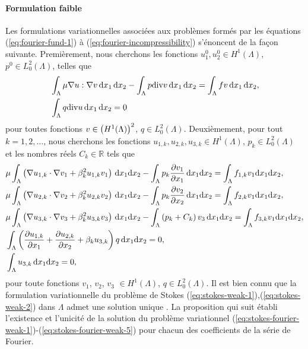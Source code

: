 \paragraph{Formulation faible}\label{sec:stokes-fourier-weak}
Les formulations variationnelles associées aux problèmes formés par
les équations (\ref{eq:fourier-fund-1}) à
(\ref{eq:fourier-incompressibility}) s'énoncent de la façon
suivante. Premièrement, nous cherchons les fonctions $u_1^0,u_2^0
\in H^1(\Lambda)$, $p^0 \in L^2_0(\Lambda)$, telles que
\begin{align}
&\int_\Lambda \mu \nabla u : \nabla v \,\mathrm dx_1\,\mathrm dx_2 -
\int_\Lambda p\mathrm{div} v \,\mathrm dx_1\,\mathrm dx_2 = \int_\Lambda f v
\,\mathrm dx_1\,\mathrm dx_2,\label{eq:stokes-weak-1}\\
&\int_\Lambda q\mathrm{div} u \,\mathrm dx_1\,\mathrm dx_2 = 0\label{eq:stokes-weak-2}
\end{align}
pour toutes fonctions $v \in \left( H^1(\Lambda) \right)^2$, $q \in
L_0^2(\Lambda)$. Deuxièmement, pour tout $k = 1, 2, \dots$, nous cherchons les
fonctions $u_{1,k},u_{2,k},u_{3,k} \in H^1(\Lambda)$, $p_k \in
L_0^2(\Lambda)$ et les nombres réels $C_k\in\mathbb R$ tels que
\begin{align}
  &\electrolyteviscosity \int_\Lambda \parent{\nabla u_{1,k}\cdot \nabla v_1 %
                           + \beta_k^2 u_{1,k}v_1}\,\mathrm dx_1\mathrm dx_2 %
  - \int_\Lambda p_k\frac{\partial v_1}{\partial x_1}\,\mathrm dx_1\mathrm dx_2 %
  = \int_\Lambda f_{1,k}v_1\mathrm dx_1\mathrm dx_2, \label{eq:stokes-fourier-weak-1}\\
  &\electrolyteviscosity \int_\Lambda \parent{\nabla u_{2,k}\cdot \nabla v_2 %
                           + \beta_k^2 u_{2,k}v_2}\,\mathrm dx_1\mathrm dx_2 %
  - \int_\Lambda p_k\frac{\partial v_2}{\partial x_2}\,\mathrm dx_1\mathrm dx_2 %
  = \int_\Lambda f_{2,k}v_1\mathrm dx_1\mathrm dx_2, \label{eq:stokes-fourier-weak-2}\\
  &\electrolyteviscosity \int_\Lambda \parent{\nabla u_{3,k}\cdot \nabla v_3 %
                           + \beta_k^2 u_{3,k}v_3}\,\mathrm dx_1\mathrm dx_2 %
  - \int_\Lambda \parent{p_k + C_k}v_3\,\mathrm dx_1\mathrm dx_2 %
  = \int_\Lambda f_{3,k}v_1\mathrm dx_1\mathrm dx_2, \label{eq:stokes-fourier-weak-3}\\
  &\int_\Lambda \parent{\frac{\partial u_{1,k}}{\partial x_1} %
                       + \frac{\partial u_{2,k}}{\partial x_2} + \beta_k u_{3,k}}q\,\mathrm dx_1\mathrm dx_2 %
  = 0,\label{eq:stokes-fourier-weak-4}\\
  &\int_\Lambda u_{3,k}\,\mathrm dx_1\mathrm dx_2 %
  = 0, \label{eq:stokes-fourier-weak-5}
\end{align}
pour toute fonctions $v_1$, $v_2$, $v_3$ $\in H^1(\Lambda)$, $q \in
L_0^2(\Lambda)$. Il est bien connu que la formulation variationnelle
du problème de Stokes
(\ref{eq:stokes-weak-1}),(\ref{eq:stokes-weak-2}) dans $\Lambda$ admet
une solution unique \cite{Temam1977}. La proposition qui suit établi l'existence et
l'unicité de la solution du problème variationnel
(\ref{eq:stokes-fourier-weak-1})-(\ref{eq:stokes-fourier-weak-5}) pour
chacun des coefficients de la série de Fourier.

